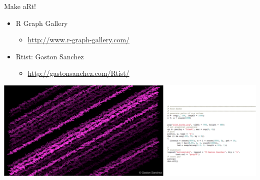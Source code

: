 \documentclass[
  ignorenonframetext,
]{beamer}
\providecommand{\tightlist}{%
  \setlength{\itemsep}{0pt}\setlength{\parskip}{0pt}}
\begin{document}
\begin{frame}{Make aRt!}
\protect\hypertarget{make-art}{}

\begin{itemize}
\tightlist
\item
  R Graph Gallery

  \begin{itemize}
  \tightlist
  \item
    \url{http://www.r-graph-gallery.com/}
  \end{itemize}
\item
  Rtist: Gaston Sanchez

  \begin{itemize}
  \tightlist
  \item
    \url{http://gastonsanchez.com/Rtist/}
  \end{itemize}
\end{itemize}

\includegraphics{../external/images/funR_5_aRt_pink_combo.png}

\end{frame}
\end{document}
